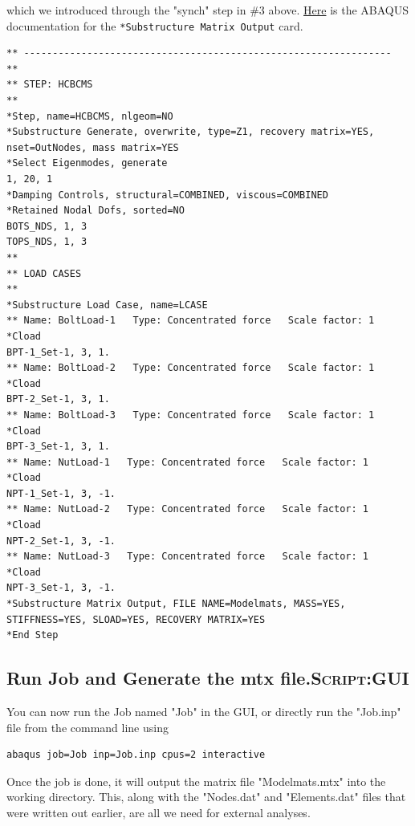 \documentclass[11pt]{article}
\begin{document}
\begin{enumerate}
which we introduced through the "synch" step in \#3 above.
\href{https://classes.engineering.wustl.edu/2009/spring/mase5513/abaqus/docs/v6.6/books/key/default.htm?startat=ch18abk43.html}{Here} is the ABAQUS documentation for the \texttt{*Substructure Matrix Output} card.
\begin{verbatim}
** ----------------------------------------------------------------
** 
** STEP: HCBCMS
** 
*Step, name=HCBCMS, nlgeom=NO
*Substructure Generate, overwrite, type=Z1, recovery matrix=YES, nset=OutNodes, mass matrix=YES
*Select Eigenmodes, generate
1, 20, 1
*Damping Controls, structural=COMBINED, viscous=COMBINED
*Retained Nodal Dofs, sorted=NO
BOTS_NDS, 1, 3
TOPS_NDS, 1, 3
** 
** LOAD CASES
** 
*Substructure Load Case, name=LCASE
** Name: BoltLoad-1   Type: Concentrated force   Scale factor: 1
*Cload
BPT-1_Set-1, 3, 1.
** Name: BoltLoad-2   Type: Concentrated force   Scale factor: 1
*Cload
BPT-2_Set-1, 3, 1.
** Name: BoltLoad-3   Type: Concentrated force   Scale factor: 1
*Cload
BPT-3_Set-1, 3, 1.
** Name: NutLoad-1   Type: Concentrated force   Scale factor: 1
*Cload
NPT-1_Set-1, 3, -1.
** Name: NutLoad-2   Type: Concentrated force   Scale factor: 1
*Cload
NPT-2_Set-1, 3, -1.
** Name: NutLoad-3   Type: Concentrated force   Scale factor: 1
*Cload
NPT-3_Set-1, 3, -1.
*Substructure Matrix Output, FILE NAME=Modelmats, MASS=YES, STIFFNESS=YES, SLOAD=YES, RECOVERY MATRIX=YES
*End Step
\end{verbatim}
\end{enumerate}
\subsection{Run Job and Generate the mtx file.\hfill{}\textsc{Script:GUI}}
\label{sec:org924ef0c}
You can now run the Job named "Job" in the GUI, or directly run the "Job.inp" file from the command line using
\begin{verbatim}
abaqus job=Job inp=Job.inp cpus=2 interactive
\end{verbatim}
Once the job is done, it will output the matrix file "Modelmats.mtx" into the working directory.
This, along with the "Nodes.dat" and "Elements.dat" files that were written out earlier, are all we need for external analyses.
\end{document}
